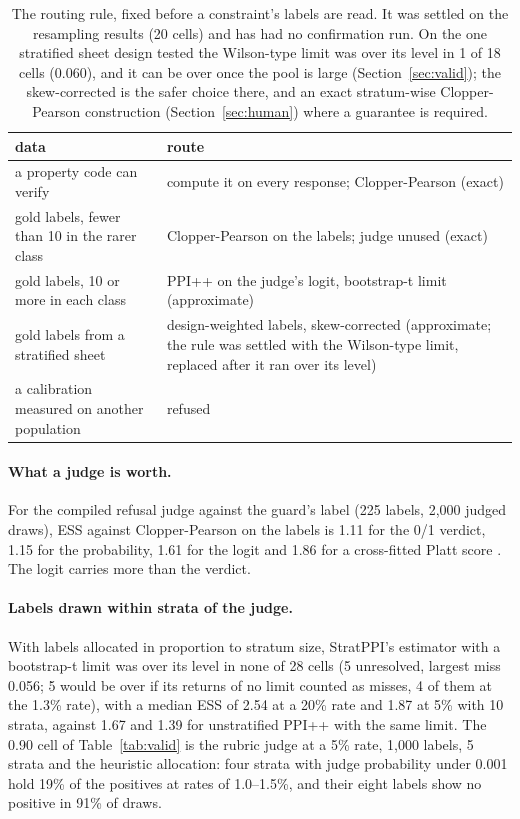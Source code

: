 \begin{table}[t]
\centering
\small
\begin{tabular}{@{}p{3.4cm}p{3.6cm}@{}}
\toprule
data & route \\
\midrule
a property code can verify & compute it on every response; Clopper-Pearson (exact) \\
gold labels, fewer than 10 in the rarer class & Clopper-Pearson on the labels; judge unused (exact) \\
gold labels, 10 or more in each class & PPI++ on the judge's logit, bootstrap-t limit (approximate) \\
gold labels from a stratified sheet & design-weighted labels, skew-corrected \SWT{} (approximate; the rule was settled with the Wilson-type limit, replaced after it ran over its level) \\
a calibration measured on another population & refused \\
\bottomrule
\end{tabular}
\caption{The routing rule, fixed before a constraint's labels are read. It was settled on the resampling results (20
cells) and has had no confirmation run. On the one stratified sheet design tested the
Wilson-type limit was over its level in 1 of 18 cells (0.060), and it can be over once the pool is large
(Section~\ref{sec:valid}); the skew-corrected \SWT{} is the safer choice
there, and an exact stratum-wise Clopper-Pearson construction (Section~\ref{sec:human}) where a guarantee is required.}
\label{tab:routing}
\end{table}

\paragraph{What a judge is worth.} For the compiled refusal judge against the guard's label (225 labels, 2,000 judged
draws), ESS against Clopper-Pearson on the labels is 1.11 for the 0/1 verdict, 1.15 for the probability, 1.61 for the
logit and 1.86 for a cross-fitted Platt score \citep{platt1999}. The logit carries more than the verdict.

\paragraph{Labels drawn within strata of the judge.} With labels allocated in proportion to stratum size, StratPPI's
estimator with a bootstrap-t limit was over its level in none of 28 cells (5 unresolved, largest miss 0.056; 5 would be
over if its returns of no limit counted as misses, 4 of them at the 1.3\% rate), with a median ESS of 2.54 at a 20\% rate
and 1.87 at 5\% with 10 strata, against 1.67 and 1.39 for unstratified PPI++ with the same limit. The 0.90 cell of
Table~\ref{tab:valid} is the rubric judge at a 5\% rate, 1,000 labels, 5 strata and the heuristic allocation: four
strata with judge probability under 0.001 hold 19\% of the positives at rates of 1.0--1.5\%, and their eight labels show
no positive in 91\% of draws.

